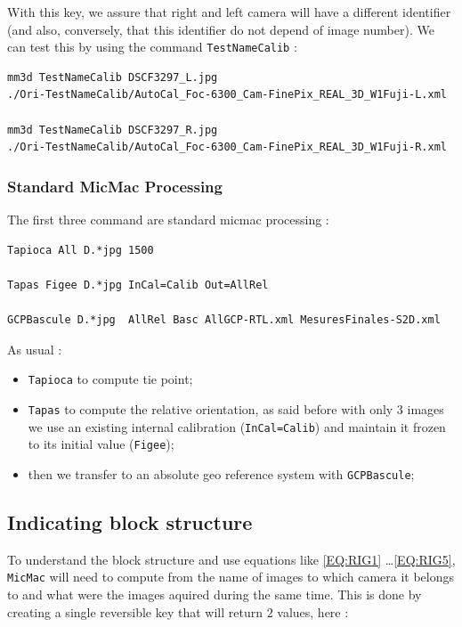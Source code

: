 With this key, we assure that right and left camera will have a different identifier (and also, conversely, that 
this identifier do not depend  of image number). We can test this by using the command  {\tt TestNameCalib} :


\begin{verbatim}
mm3d TestNameCalib DSCF3297_L.jpg
./Ori-TestNameCalib/AutoCal_Foc-6300_Cam-FinePix_REAL_3D_W1Fuji-L.xml

mm3d TestNameCalib DSCF3297_R.jpg
./Ori-TestNameCalib/AutoCal_Foc-6300_Cam-FinePix_REAL_3D_W1Fuji-R.xml
\end{verbatim}

\subsubsection{Standard MicMac Processing}

The first three command are standard micmac processing :

\begin{verbatim}
Tapioca All D.*jpg 1500

Tapas Figee D.*jpg InCal=Calib Out=AllRel

GCPBascule D.*jpg  AllRel Basc AllGCP-RTL.xml MesuresFinales-S2D.xml
\end{verbatim}

As usual :

\begin{itemize}
    \item {\tt Tapioca} to compute tie point;
    \item {\tt Tapas} to compute the relative orientation, as said before with only $3$ images we use an existing internal
          calibration ({\tt InCal=Calib}) and maintain it frozen to its initial value ({\tt Figee});
    \item then we transfer to an absolute geo reference system with {\tt GCPBascule};
\end{itemize}

\subsection{Indicating block structure}

To understand the block structure and use equations like  \ref{EQ:RIG1} \dots \ref{EQ:RIG5}, 
{\tt MicMac} will need to compute from the name of images to which camera it belongs to and 
what were the images aquired during the same time. This is done by creating a single reversible key
that will return $2$ values, here :

